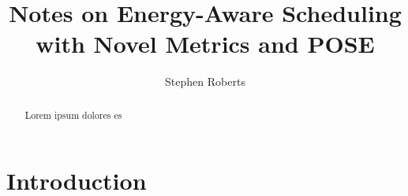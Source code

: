 \documentclass[a4paper]{article}
\title{Notes on Energy-Aware Scheduling with Novel Metrics and POSE}
\author{Stephen Roberts}
\date{}
\begin{document}
\maketitle

\begin{abstract}
Lorem ipsum dolores es

\end{abstract}


\section{Introduction}
\end{document}
